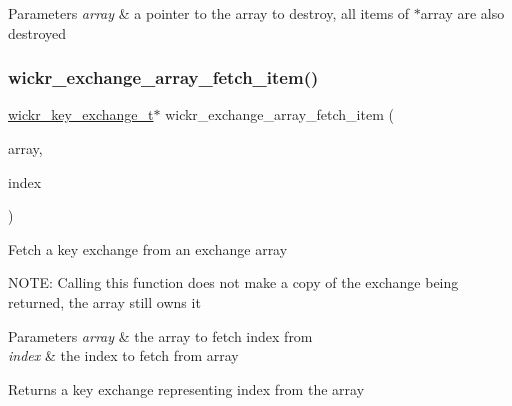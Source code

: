 \begin{DoxyParams}{Parameters}
{\em array} & a pointer to the array to destroy, all items of \textquotesingle{}$\ast$array\textquotesingle{} are also destroyed \\
\hline
\end{DoxyParams}
\mbox{\label{group__wickr__key__exchange_ga333510c3c7eeb8e33f94495de6bb122d}} 
\subsubsection{\texorpdfstring{wickr\+\_\+exchange\+\_\+array\+\_\+fetch\+\_\+item()}{wickr\_exchange\_array\_fetch\_item()}}
{\footnotesize\ttfamily \mbox{\hyperlink{structwickr__key__exchange}{wickr\+\_\+key\+\_\+exchange\+\_\+t}}$\ast$ wickr\+\_\+exchange\+\_\+array\+\_\+fetch\+\_\+item (\begin{DoxyParamCaption}\item[{wickr\+\_\+exchange\+\_\+array\+\_\+t $\ast$}]{array,  }\item[{uint32\+\_\+t}]{index }\end{DoxyParamCaption})}

Fetch a key exchange from an exchange array

N\+O\+TE\+: Calling this function does not make a copy of the exchange being returned, the array still owns it


\begin{DoxyParams}{Parameters}
{\em array} & the array to fetch \textquotesingle{}index\textquotesingle{} from \\
\hline
{\em index} & the index to fetch from \textquotesingle{}array\textquotesingle{} \\
\hline
\end{DoxyParams}
\begin{DoxyReturn}{Returns}
a key exchange representing \textquotesingle{}index\textquotesingle{} from the array 
\end{DoxyReturn}
\mbox{\label{group__wickr__key__exchange_ga907d700b76b748f80796b4404c7172c2}} 
